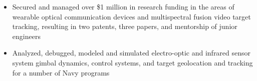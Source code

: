 \begin{itemize} [leftmargin = \itemmargin]
	\item Secured and managed over \$1 million in research funding in the areas of wearable optical communication devices and multispectral fusion video target tracking, resulting in two patents, three papers, and mentorship of junior engineers
	
	\item Analyzed, debugged, modeled and simulated electro-optic and infrared sensor system gimbal dynamics, control systems, and target geolocation and tracking for a number of Navy programs
	
\end{itemize} 